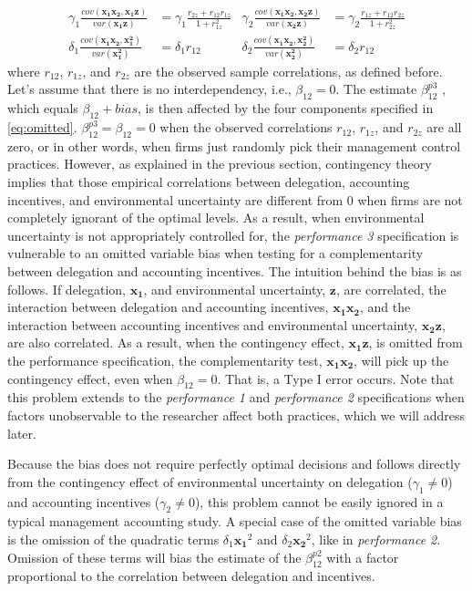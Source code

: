 \documentclass[12pt]{article}
\begin{document}
\begin{equation}\label{eq:omitted}
\begin{aligned}
\gamma_1 \frac{cov(\mathbf{x_1 x_2}, \mathbf{x_1 z})}{var(\mathbf{x_1 z})} &= 
\gamma_1 \frac{r_{2z} + r_{12} r_{1z}}{1 + r_{1z}^2}
&\gamma_2 \frac{cov(\mathbf{x_1 x_2}, \mathbf{x_2 z})}{var(\mathbf{x_2 z})} &= 
\gamma_2 \frac{r_{1z} + r_{12} r_{2z}}{1 + r_{2z}^2}
\\
\delta_1 \frac{cov(\mathbf{x_1 x_2}, \mathbf{x_1^2})}{var(\mathbf{x_1^2})} &= 
\delta_1 r_{12}
&\delta_2 \frac{cov(\mathbf{x_1 x_2}, \mathbf{x_2^2})}{var(\mathbf{x_2^2})} &= 
\delta_2 r_{12}
\end{aligned}
\end{equation}
where $r_{12}$, $r_{1z}$, and $r_{2z}$ are the observed sample correlations, as defined before. Let's assume that there is no interdependency, i.e., $\beta_{12}=0$. The estimate $\beta^{p3}_{12}$ , which equals $\beta_{12} + bias$, is then affected by the four components specified in \eqref{eq:omitted}. $\beta^{p3}_{12}=\beta_{12}=0$ when the observed correlations $r_{12}$, $r_{1z}$, and $r_{2z}$ are all zero, or in other words, when firms just randomly pick their management control practices. However, as explained in the previous section, contingency theory implies that those empirical correlations between delegation, accounting incentives, and environmental uncertainty are different from $0$ when firms are not completely ignorant of the optimal levels. As a result, when environmental uncertainty is not appropriately controlled for, the \emph{performance 3} specification is vulnerable to an omitted variable bias when testing for a complementarity between delegation and accounting incentives. The intuition behind the bias is as follows. If delegation, $\mathbf{x_1}$, and environmental uncertainty, $\mathbf{z}$, are correlated, the interaction between delegation and accounting incentives, $\mathbf{x_1 x_2}$, and the interaction between accounting incentives and environmental uncertainty, $\mathbf{x_2 z}$, are also correlated. As a result, when the contingency effect, $\mathbf{x_1 z}$, is omitted from the performance specification, the complementarity test, $\mathbf{x_1 x_2}$, will pick up the contingency effect, even when $\beta_{12}=0$. That is, a Type I error occurs. Note that this problem extends to the \emph{performance 1} and \emph{performance 2} specifications when factors unobservable to the researcher affect both practices, which we will address later.

Because the bias does not require perfectly optimal decisions and follows directly from the contingency effect of environmental uncertainty on delegation ($\gamma_1 \neq 0$) and accounting incentives ($\gamma_2 \neq 0$), this problem cannot be easily ignored in a typical management accounting study. A special case of the omitted variable bias is the omission of the quadratic terms $\delta_1 \mathbf{x_1}^2$ and $\delta_2 \mathbf{x_2}^2$, like in \emph{performance 2}. Omission of these terms will bias the estimate of the $\beta^{p2}_{12}$ with a factor proportional to the correlation between delegation and incentives.
\end{document}
